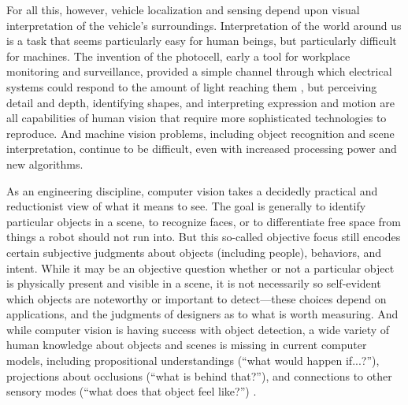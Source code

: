 For all this, however, vehicle localization and sensing depend upon
visual interpretation of the vehicle's surroundings. Interpretation of
the world around us is a task that seems
particularly easy for human beings, but particularly difficult for
machines. The invention of the photocell, early a tool for workplace
monitoring and surveillance, provided a simple channel through which
electrical systems could respond to the amount of light reaching
them \cite[p. 44]{faxed} \cite[p. 361]{nyeElectrifying}, but perceiving detail and
depth, identifying shapes, and interpreting expression and motion are
all capabilities of human vision that require more sophisticated
technologies to reproduce. And machine
vision problems, including object recognition and scene
interpretation, continue to be difficult, even with increased
processing power and new algorithms.

As an engineering discipline, computer vision takes a decidedly
practical and reductionist view of what it means to see. The goal is
generally to identify particular objects in a scene, to recognize
faces, or to differentiate free space from things a robot should
not run into. But this so-called objective focus still encodes
certain subjective judgments about objects (including people),
behaviors, and intent. While it may be an objective question whether or not a
particular object is physically present and visible in
a scene, it is not
necessarily so self-evident which objects are noteworthy or important
to detect---these choices depend on applications, and the judgments of
designers as to what is worth measuring. And while computer vision is having success
with object detection, a wide variety of human knowledge
about objects and scenes is missing in current computer
models, including propositional understandings (``what would happen
if...?''), projections about occlusions (``what is behind that?''),
and 
connections to other sensory modes (``what does that object feel like?'') \cite{gomesJordan}.



